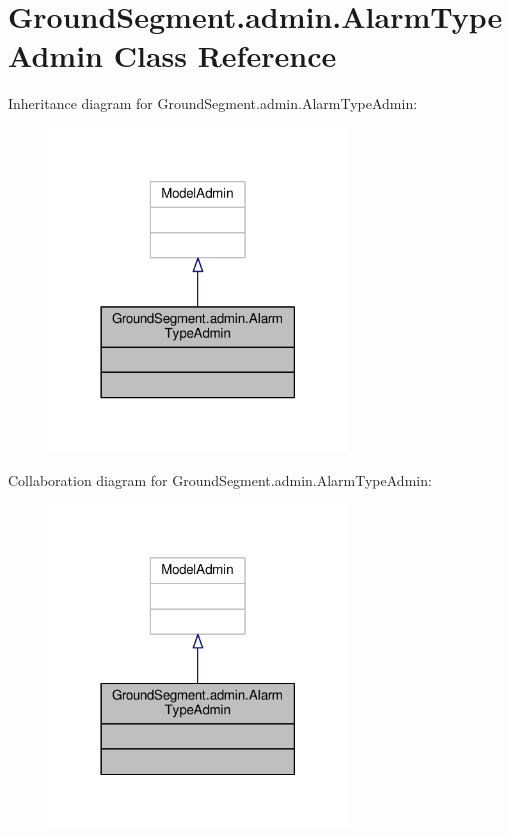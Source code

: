 \hypertarget{class_ground_segment_1_1admin_1_1_alarm_type_admin}{}\section{Ground\+Segment.\+admin.\+Alarm\+Type\+Admin Class Reference}
\label{class_ground_segment_1_1admin_1_1_alarm_type_admin}


Inheritance diagram for Ground\+Segment.\+admin.\+Alarm\+Type\+Admin\+:\nopagebreak
\begin{figure}[H]
\begin{center}
\leavevmode
\includegraphics[width=225pt]{class_ground_segment_1_1admin_1_1_alarm_type_admin__inherit__graph}
\end{center}
\end{figure}


Collaboration diagram for Ground\+Segment.\+admin.\+Alarm\+Type\+Admin\+:\nopagebreak
\begin{figure}[H]
\begin{center}
\leavevmode
\includegraphics[width=225pt]{class_ground_segment_1_1admin_1_1_alarm_type_admin__coll__graph}
\end{center}
\end{figure}


